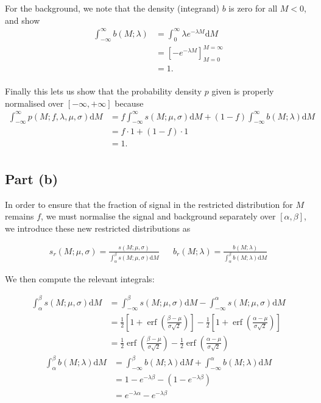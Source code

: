 \documentclass[12pt]{article}
\DeclareMathOperator{\erf}{erf}
\begin{document}
For the background, we note that the density (integrand) $b$ is zero for all $M<0$, and show
\begin{align*}
    \int_{-\infty}^\infty b(M;\lambda) & = \int_0^\infty \lambda e^{-\lambda M}\mathrm{d}M \\
    & = \left[-e^{-\lambda M}\right]_{M=0}^{M=\infty} \\
    & = 1. \\
\end{align*}

Finally this lets us show that the probability density $p$ given is properly normalised over $[-\infty,+\infty]$ because
\begin{align*}
    \int_{-\infty}^\infty p(M; f,\lambda,\mu,\sigma)\mathrm{d}M & = f\int_{-\infty}^\infty s(M;\mu, \sigma)\mathrm{d}M + (1-f)\int_{-\infty}^\infty b(M;\lambda)\mathrm{d}M \\
    & = f\cdot 1 + (1-f)\cdot 1\\
    & = 1. \\
\end{align*}

\subsection*{Part (b)}

In order to ensure that the fraction of signal in the restricted distribution for $M$ remains $f$, we must normalise the signal and background separately over $[\alpha,\beta]$, we introduce these new restricted distributions as

\begin{align*}
    s_r(M;\mu,\sigma) = \frac{s(M;\mu,\sigma)}{\int_\alpha^\beta s(M;\mu,\sigma)\mathrm{d}M} && b_r(M;\lambda) = \frac{b(M;\lambda)}{\int_\alpha^\beta b(M;\lambda)\mathrm{d}M}
\end{align*}

We then compute the relevant integrals:

\begin{align*}
    \int_\alpha^\beta s(M;\mu,\sigma)\mathrm{d}M & = \int_{-\infty}^\beta s(M;\mu,\sigma)\mathrm{d}M - \int_{-\infty}^\alpha s(M;\mu,\sigma)\mathrm{d}M \\
    & = \frac{1}{2}\left[1 + \erf\left(\frac{\beta - \mu}{\sigma\sqrt{2}}\right)\right] - \frac{1}{2}\left[1 + \erf\left(\frac{\alpha - \mu}{\sigma\sqrt{2}}\right)\right] \\
    & = \frac{1}{2}\erf\left(\frac{\beta - \mu}{\sigma\sqrt{2}}\right) - \frac{1}{2}\erf\left(\frac{\alpha - \mu}{\sigma\sqrt{2}}\right)
\end{align*}
\begin{align*}
    \int_\alpha^\beta b(M;\lambda)\mathrm{d}M & = \int_{-\infty}^\beta b(M;\lambda)\mathrm{d}M + \int_{-\infty}^\alpha b(M;\lambda)\mathrm{d}M \\
    & = 1 - e^{-\lambda\beta} - (1 - e^{-\lambda\beta}) \\
    & = e^{-\lambda\alpha} - e^{-\lambda\beta}
\end{align*}
\end{document}
